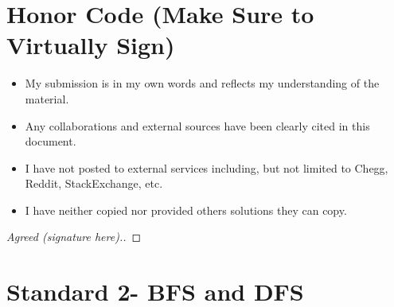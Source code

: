 \documentclass[11pt]{article}
\theoremstyle{definition}
\theoremstyle{definition}
\newtheorem{required}{Problem}
\theoremstyle{definition}
\begin{document}
\section{Honor Code (Make Sure to Virtually Sign)} \label{HonorCode}

\begin{itemize}
\item My submission is in my own words and reflects my understanding of the material.
\item Any collaborations and external sources have been clearly cited in this document.
\item I have not posted to external services including, but not limited to Chegg, Reddit, StackExchange, etc.
\item I have neither copied nor provided others solutions they can copy.
\end{itemize}


\begin{proof}[Agreed (signature here).]
\end{proof}

\newpage
\section{Standard 2- BFS and DFS}
\end{document}
